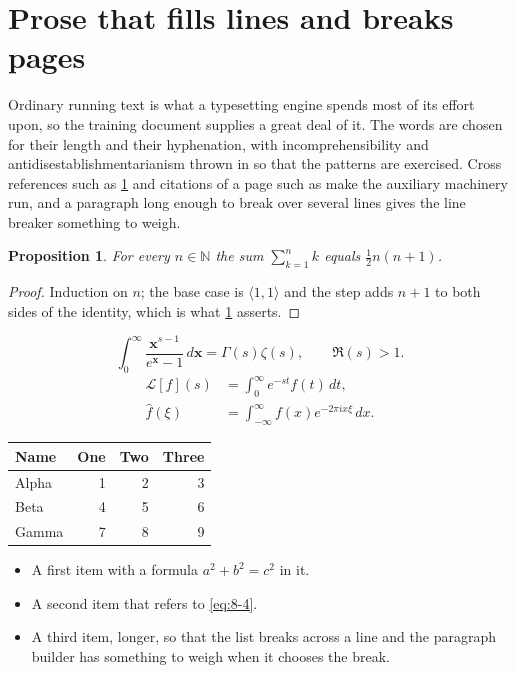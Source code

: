 \documentclass[11pt,a4paper]{report}
\theoremstyle{plain}
\newtheorem{proposition}{Proposition}[chapter]
\newcommand{\vecn}[1]{\mathbf{#1}}
\newcommand{\pairs}[2]{\langle #1,#2\rangle}
\begin{document}
\section{Prose that fills lines and breaks pages}
\label{sec:prose8-4}
Ordinary running text is what a typesetting engine spends most of its effort
upon, so the training document supplies a great deal of it. The words are
chosen for their length and their hyphenation, with incomprehensibility and
antidisestablishmentarianism thrown in so that the patterns are exercised.
Cross references such as \cref{sec:prose8-4} and citations of a page such
as \pageref{sec:prose8-4} make the auxiliary machinery run, and a
paragraph long enough to break over several lines gives the line breaker
something to weigh.
\begin{proposition}\label{prop:8-4}
For every $n\in\mathbb{N}$ the sum $\sum_{k=1}^{n}k$ equals
$\tfrac{1}{2}n(n+1)$.
\end{proposition}
\begin{proof}
Induction on $n$; the base case is $\pairs{1}{1}$ and the step adds $n+1$ to
both sides of the identity, which is what \cref{prop:8-4} asserts.
\end{proof}
\begin{equation}\label{eq:8-4}
  \int_{0}^{\infty}\frac{\vecn{x}^{s-1}}{e^{\vecn{x}}-1}\,d\vecn{x}
    = \Gamma(s)\zeta(s),\qquad \Re(s)>1 .
\end{equation}
\begin{align}
  \mathcal{L}[f](s) &= \int_{0}^{\infty} e^{-st} f(t)\,dt, \\
  \widehat{f}(\xi)  &= \int_{-\infty}^{\infty} f(x) e^{-2\pi i x\xi}\,dx .
\end{align}
\par\noindent\begin{center}
\begin{tabular}{lrrr}
\hline
Name & One & Two & Three \\
\hline
Alpha & 1 & 2 & 3 \\
Beta & 4 & 5 & 6 \\
Gamma & 7 & 8 & 9 \\
\hline
\end{tabular}
\end{center}
\begin{itemize}
  \item A first item with a formula $a^2+b^2=c^2$ in it.
  \item A second item that refers to \eqref{eq:8-4}.
  \item A third item, longer, so that the list breaks across a line and the
    paragraph builder has something to weigh when it chooses the break.
\end{itemize}
\end{document}
